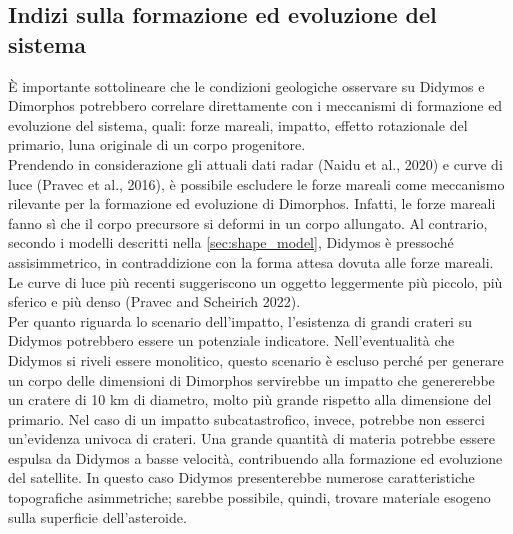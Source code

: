 \documentclass[a4paper,11pt,openright]{book}
\begin{document}
\subsection{Indizi sulla formazione ed evoluzione del sistema}
È importante sottolineare che le condizioni geologiche osservare su Didymos e Dimorphos potrebbero correlare direttamente con i meccanismi di formazione ed evoluzione del sistema, quali: forze mareali, impatto, effetto rotazionale del primario, luna originale di un corpo progenitore.\\
Prendendo in considerazione gli attuali dati radar (Naidu et al., 2020) e curve di luce (Pravec et al., 2016), è possibile escludere le forze mareali come meccanismo rilevante per la formazione ed evoluzione di Dimorphos. Infatti, le forze mareali fanno sì che il corpo precursore si deformi in un corpo allungato. Al contrario, secondo i modelli descritti nella \cref{sec:shape_model}, Didymos è pressoché assisimmetrico, in contraddizione con la forma attesa dovuta alle forze mareali. Le curve di luce più recenti suggeriscono un oggetto leggermente più piccolo, più sferico e più denso (Pravec and Scheirich 2022).\\
Per quanto riguarda lo scenario dell'impatto, l'esistenza di grandi crateri su Didymos potrebbero essere un potenziale indicatore. Nell'eventualità che Didymos si riveli essere monolitico, questo scenario è escluso perché per generare un corpo delle dimensioni di Dimorphos servirebbe un impatto che genererebbe un cratere di 10 km di diametro, molto più grande rispetto alla dimensione del primario. Nel caso di un impatto subcatastrofico, invece, potrebbe non esserci un'evidenza univoca di crateri. Una grande quantità di materia potrebbe essere espulsa da Didymos a basse velocità, contribuendo alla formazione ed evoluzione del satellite. In questo caso Didymos presenterebbe numerose caratteristiche topografiche asimmetriche; sarebbe possibile, quindi, trovare materiale esogeno sulla superficie dell'asteroide.\\
\end{document}
